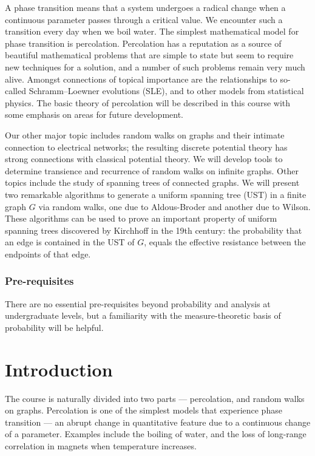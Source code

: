 \documentclass[a4paper]{article}
\begin{document}
\maketitle
{\small
\setlength{\parindent}{0em}
\setlength{\parskip}{1em}

A phase transition means that a system undergoes a radical change when a continuous parameter passes through a critical value. We encounter such a transition every day when we boil water. The simplest mathematical model for phase transition is percolation. Percolation has a reputation as a source of beautiful mathematical problems that are simple to state but seem to require new techniques for a solution, and a number of such problems remain very much alive. Amongst connections of topical importance are the relationships to so-called Schramm--Loewner evolutions (SLE), and to other models from statistical physics. The basic theory of percolation will be described in this course with some emphasis on areas for future development.

Our other major topic includes random walks on graphs and their intimate connection to electrical networks; the resulting discrete potential theory has strong connections with classical potential theory. We will develop tools to determine transience and recurrence of random walks on infinite graphs. Other topics include the study of spanning trees of connected graphs. We will present two remarkable algorithms to generate a uniform spanning tree (UST) in a finite graph $G$ via random walks, one due to Aldous-Broder and another due to Wilson. These algorithms can be used to prove an important property of uniform spanning trees discovered by Kirchhoff in the 19th century: the probability that an edge is contained in the UST of $G$, equals the effective resistance between the endpoints of that edge.

\subsubsection*{Pre-requisites}
There are no essential pre-requisites beyond probability and analysis at undergraduate levels, but a familiarity with the measure-theoretic basis of probability will be helpful.
}
\tableofcontents

\section{Introduction}
The course is naturally divided into two parts --- percolation, and random walks on graphs. Percolation is one of the simplest models that experience phase transition --- an abrupt change in quantitative feature due to a continuous change of a parameter. Examples include the boiling of water, and the loss of long-range correlation in magnets when temperature increases.
\end{document}
